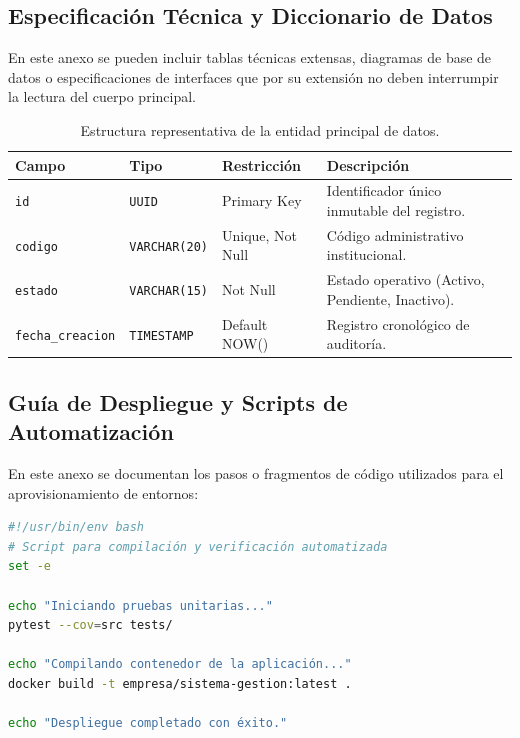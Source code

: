
\subsection{Especificación Técnica y Diccionario de Datos}
\label{anexo:diccionario_datos}

En este anexo se pueden incluir tablas técnicas extensas, diagramas de base de datos o especificaciones de interfaces que por su extensión no deben interrumpir la lectura del cuerpo principal.

\begin{table}[htbp]
  \centering
  \caption{Estructura representativa de la entidad principal de datos.}
  \label{tab:anexo_entidad_datos}
  \begin{tabularx}{\textwidth}{llLX}
    \toprule
    \textbf{Campo} & \textbf{Tipo} & \textbf{Restricción} & \textbf{Descripción} \\
    \midrule
    \texttt{id} & \texttt{UUID} & Primary Key & Identificador único inmutable del registro. \\
    \texttt{codigo} & \texttt{VARCHAR(20)} & Unique, Not Null & Código administrativo institucional. \\
    \texttt{estado} & \texttt{VARCHAR(15)} & Not Null & Estado operativo (Activo, Pendiente, Inactivo). \\
    \texttt{fecha\_creacion} & \texttt{TIMESTAMP} & Default NOW() & Registro cronológico de auditoría. \\
    \bottomrule
  \end{tabularx}
\end{table}

\subsection{Guía de Despliegue y Scripts de Automatización}
\label{anexo:scripts_despliegue}

En este anexo se documentan los pasos o fragmentos de código utilizados para el aprovisionamiento de entornos:

\begin{lstlisting}[language=bash, caption={Script de automatización de pruebas y compilación del proyecto.}, label={lst:script_automatizacion}]
#!/usr/bin/env bash
# Script para compilación y verificación automatizada
set -e

echo "Iniciando pruebas unitarias..."
pytest --cov=src tests/

echo "Compilando contenedor de la aplicación..."
docker build -t empresa/sistema-gestion:latest .

echo "Despliegue completado con éxito."
\end{lstlisting}
